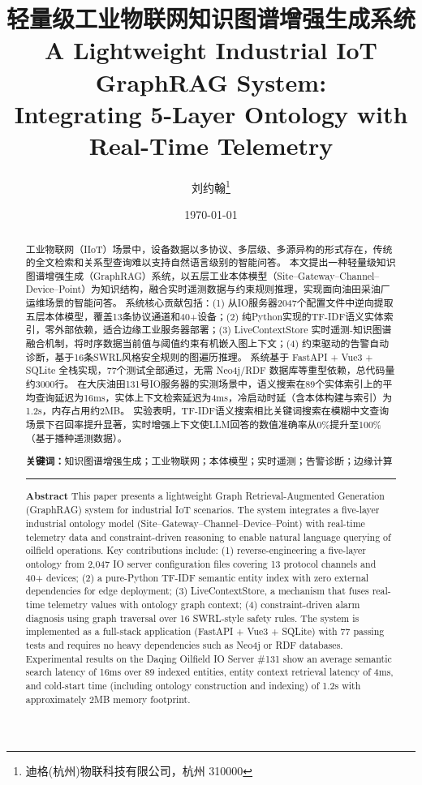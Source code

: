\documentclass[12pt,a4paper]{article}
\title{\heiti\zihao{3} 轻量级工业物联网知识图谱增强生成系统 \\[4pt]
       \rmfamily\large A Lightweight Industrial IoT GraphRAG System: \\
       Integrating 5-Layer Ontology with Real-Time Telemetry}
\author{刘约翰\thanks{迪格(杭州)物联科技有限公司，杭州 310000}}
\date{\today}
\begin{document}
\maketitle

\begin{abstract}
\noindent
工业物联网（IIoT）场景中，设备数据以多协议、多层级、多源异构的形式存在，传统的全文检索和关系型查询难以支持自然语言级别的智能问答。
本文提出一种轻量级知识图谱增强生成（GraphRAG）系统，以五层工业本体模型（Site--Gateway--Channel--Device--Point）为知识结构，融合实时遥测数据与约束规则推理，实现面向油田采油厂运维场景的智能问答。
系统核心贡献包括：(1) 从IO服务器2047个配置文件中逆向提取五层本体模型，覆盖13条协议通道和40+设备；(2) 纯Python实现的TF-IDF语义实体索引，零外部依赖，适合边缘工业服务器部署；(3) LiveContextStore 实时遥测-知识图谱融合机制，将时序数据当前值与阈值约束有机嵌入图上下文；(4) 约束驱动的告警自动诊断，基于16条SWRL风格安全规则的图遍历推理。
系统基于 FastAPI + Vue3 + SQLite 全栈实现，77个测试全部通过，无需 Neo4j/RDF 数据库等重型依赖，总代码量约3000行。
在大庆油田131号IO服务器的实测场景中，语义搜索在89个实体索引上的平均查询延迟为16ms，实体上下文检索延迟为4ms，冷启动时延（含本体构建与索引）为1.2s，内存占用约2MB。
实验表明，TF-IDF语义搜索相比关键词搜索在模糊中文查询场景下召回率提升显著，实时增强上下文使LLM回答的数值准确率从0\%提升至100\%（基于播种遥测数据）。

\vspace{6pt}
\noindent\textbf{关键词：}知识图谱增强生成；工业物联网；本体模型；实时遥测；告警诊断；边缘计算

\vspace{12pt}
\begin{center}
\rule{0.3\textwidth}{0.4pt}
\end{center}

\noindent\textbf{Abstract}
This paper presents a lightweight Graph Retrieval-Augmented Generation (GraphRAG) system for industrial IoT scenarios.
The system integrates a five-layer industrial ontology model (Site--Gateway--Channel--Device--Point) with real-time telemetry data and constraint-driven reasoning to enable natural language querying of oilfield operations.
Key contributions include: (1) reverse-engineering a five-layer ontology from 2,047 IO server configuration files covering 13 protocol channels and 40+ devices; (2) a pure-Python TF-IDF semantic entity index with zero external dependencies for edge deployment; (3) LiveContextStore, a mechanism that fuses real-time telemetry values with ontology graph context; (4) constraint-driven alarm diagnosis using graph traversal over 16 SWRL-style safety rules.
The system is implemented as a full-stack application (FastAPI + Vue3 + SQLite) with 77 passing tests and requires no heavy dependencies such as Neo4j or RDF databases.
Experimental results on the Daqing Oilfield IO Server \#131 show an average semantic search latency of 16ms over 89 indexed entities, entity context retrieval latency of 4ms, and cold-start time (including ontology construction and indexing) of 1.2s with approximately 2MB memory footprint.


\end{abstract}
\end{document}
